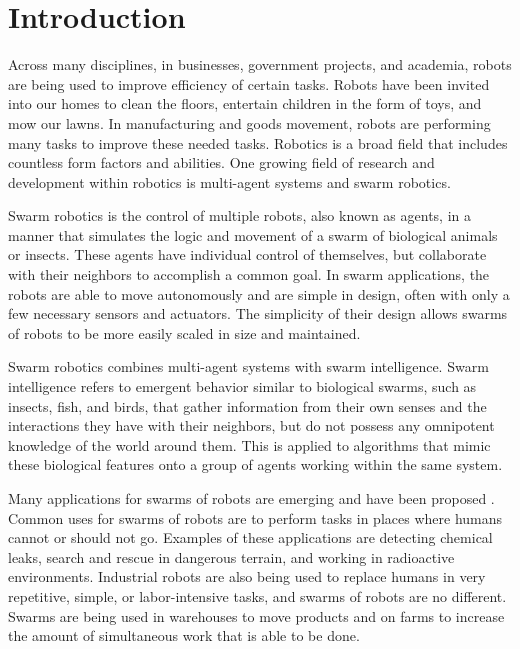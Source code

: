 \chapter{Introduction}
\label{sec:intro}

Across many disciplines, in businesses, government projects, and academia, robots are being used to improve efficiency of certain tasks. Robots have been invited into our homes to clean the floors, entertain children in the form of toys, and mow our lawns.  In manufacturing and goods movement, robots are performing many tasks to improve these needed tasks.  Robotics is a broad field that includes countless form factors and abilities. One growing field of research and development within robotics is multi-agent systems and swarm robotics.

Swarm robotics is the control of multiple robots, also known as agents, in a manner that simulates the logic and movement of a swarm of biological animals or insects. These agents have individual control of themselves, but collaborate with their neighbors to accomplish a common goal. In swarm applications, the robots are able to move autonomously and are simple in design, often with only a few necessary sensors and actuators. The simplicity of their design allows swarms of robots to be more easily scaled in size and maintained.

Swarm robotics combines multi-agent systems with swarm intelligence. Swarm intelligence refers to emergent behavior similar to biological swarms, such as insects, fish, and birds, that gather information from their own senses and the interactions they have with their neighbors, but do not possess any omnipotent knowledge of the world around them. This is applied to algorithms that mimic these biological features onto a group of agents working within the same system.

Many applications for swarms of robots are emerging and have been proposed \cite{spezzano2019special}. Common uses for swarms of robots are to perform tasks in places where humans cannot or should not go. Examples of these applications are detecting chemical leaks, search and rescue in dangerous terrain, and working in radioactive environments. Industrial robots are also being used to replace humans in very repetitive, simple, or labor-intensive tasks, and swarms of robots are no different. Swarms are being used in warehouses to move products \cite{poudel2013coordinating} and on farms \cite{spezzano2019special} to increase the amount of simultaneous work that is able to be done.

